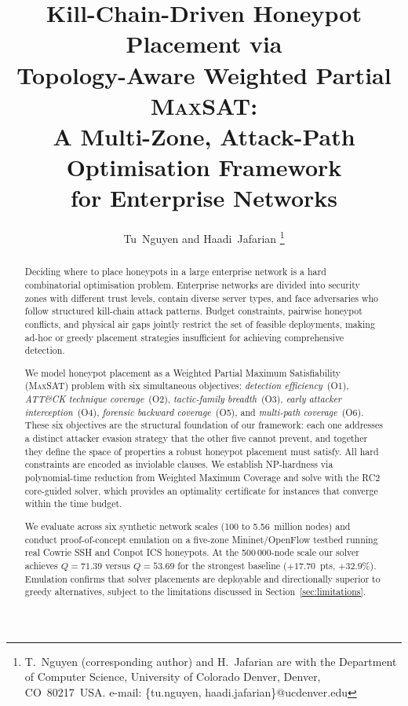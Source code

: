 \documentclass[journal]{IEEEtran}
\newcommand{\MAXSAT}{\textsc{MaxSAT}}
\begin{document}
\title{Kill-Chain-Driven Honeypot Placement via\\
Topology-Aware Weighted Partial \MAXSAT{}:\\
A Multi-Zone, Attack-Path Optimisation Framework\\
for Enterprise Networks}

\author{Tu~Nguyen and Haadi~Jafarian%
\thanks{T.~Nguyen (corresponding author) and H.~Jafarian are with
the Department of Computer Science, University of Colorado Denver,
Denver, CO~80217~USA.
e-mail: \{tu.nguyen, haadi.jafarian\}@ucdenver.edu}}

\maketitle

\begin{abstract}
Deciding where to place honeypots in a large enterprise network is a
hard combinatorial optimisation problem. Enterprise networks are
divided into security zones with different trust levels, contain
diverse server types, and face adversaries who follow structured
kill-chain attack patterns. Budget constraints, pairwise honeypot
conflicts, and physical air gaps jointly restrict the set of feasible
deployments, making ad-hoc or greedy placement strategies insufficient
for achieving comprehensive detection.

We model honeypot placement as a Weighted Partial Maximum
Satisfiability (\MAXSAT{}) problem with six simultaneous objectives:
\emph{detection efficiency}~(O1), \emph{ATT\&CK technique
coverage}~(O2), \emph{tactic-family breadth}~(O3),
\emph{early attacker interception}~(O4), \emph{forensic backward
coverage}~(O5), and \emph{multi-path coverage}~(O6). These six
objectives are the structural foundation of our framework: each
one addresses a distinct attacker evasion strategy that the other
five cannot prevent, and together they define the space of properties
a robust honeypot placement must satisfy. All hard constraints are
encoded as inviolable clauses. We establish NP-hardness via
polynomial-time reduction from Weighted Maximum Coverage and solve
with the RC2 core-guided solver, which provides an optimality
certificate for instances that converge within the time budget.

We evaluate across six synthetic network scales (100 to 5.56~million
nodes) and conduct proof-of-concept emulation on a five-zone
Mininet/OpenFlow testbed running real Cowrie SSH and Conpot ICS
honeypots. At the 500\,000-node scale our solver achieves $Q=71.39$
versus $Q=53.69$ for the strongest baseline ($+17.70$~pts,
$+32.9\%$). Emulation confirms that solver placements are deployable
and directionally superior to greedy alternatives, subject to the
limitations discussed in Section~\ref{sec:limitations}.
\end{abstract}
\end{document}
